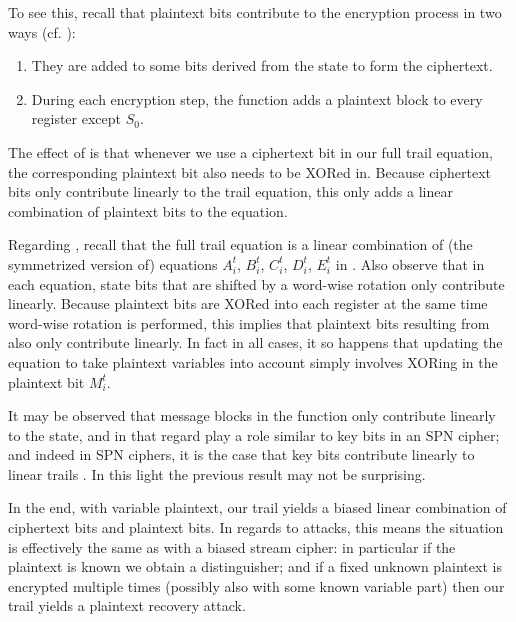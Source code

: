 To see this, recall that plaintext bits contribute to the encryption process in two ways (cf. ):
\begin{enumerate}
\item They are added to some bits derived from the state to form the ciphertext.\label{item:1}
\item During each encryption step, the \StateUpdate function adds a plaintext block to every register except $S_0$.\label{item:2}
\end{enumerate}

The effect of  is that whenever we use a ciphertext bit in our full trail equation, the corresponding plaintext bit also needs to be XORed in. Because ciphertext bits only contribute linearly to the trail equation, this only adds a linear combination of plaintext bits to the equation.

Regarding , recall that the full trail equation is a linear combination of (the symmetrized version of) equations $A^t_i$, $B^t_i$, $C^t_i$, $D^t_i$, $E^t_i$ in . Also observe that in each equation, state bits that are shifted by a word-wise rotation only contribute linearly. Because plaintext bits are XORed into each register at the same time word-wise rotation is performed, this implies that plaintext bits resulting from  also only contribute linearly.
In fact in all cases, it so happens that updating the equation to take plaintext variables into account simply involves XORing in the plaintext bit $M^t_i$.

It may be observed that message blocks in the \StateUpdate{} function only contribute linearly to the state, and in that regard play a role similar to key bits in an SPN cipher; and indeed in SPN ciphers, it is the case that key bits contribute linearly to linear trails \cite{eurocryptMatsui93}. In this light the previous result may not be surprising.

In the end, with variable plaintext, our trail yields a biased linear combination of ciphertext bits and plaintext bits.
In regards to attacks, this means the situation is effectively the same as with a biased stream cipher: in particular if the plaintext is known we obtain a distinguisher; and if a fixed unknown plaintext is encrypted multiple times (possibly also with some known variable part) then our trail yields a plaintext recovery attack.

